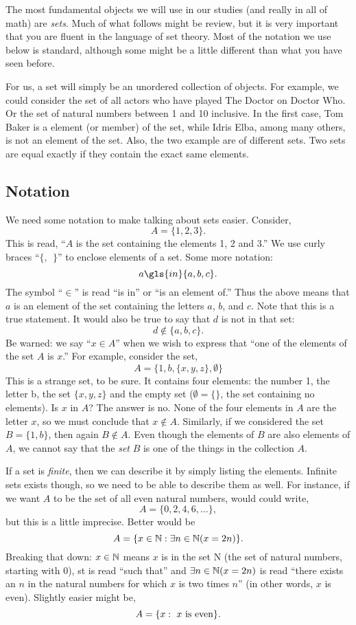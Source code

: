 \documentclass[12pt]{article}
\begin{document}
The most fundamental objects we will use in our studies (and really in all of math) are \textit{sets}.  Much of what follows might be review, but it is very important that you are fluent in the language of set theory.  Most of the notation we use below is standard, although some might be a little different than what you have seen before.

For us, a set will simply be an unordered collection of objects.  For example, we could consider the set of all actors who have played The Doctor on Doctor Who.  Or the set of natural numbers between 1 and 10 inclusive.  In the first case, Tom Baker is a element (or member) of the set, while Idris Elba, among many others, is not an element of the set.  Also, the two example are of different sets.  Two sets are equal exactly if they contain the exact same elements.



\subsection{Notation}

We need some notation to make talking about sets easier.  Consider,
\[ A = \{1, 2, 3\}.\]
This is read, ``$A$ is the set containing the elements 1, 2 and 3.''  We use curly braces ``$\{,~~ \}$'' to enclose elements of a set.  Some more notation:
\[ a \gls{in} \{a, b, c\}. \]
The symbol ``$\in$'' is read ``is in'' or ``is an element of.''  Thus the above means that $a$ is an element of the set containing the letters $a$, $b$, and $c$.  Note that this is a true statement.  It would also be true to say that $d$ is not in that set:
\[ d \not\in \{a, b, c\}.\]
Be warned: we say ``$x \in A$'' when we wish to express that ``one of the elements of the set $A$ is $x$.''  For example, consider the set,
\[A = \{1, b, \{x, y, z\}, \emptyset\}\]
This is a strange set, to be sure. It contains four elements: the number 1, the letter b, the set $\{x,y,z\}$ and the empty set ($\emptyset = \{ \}$, the set containing no elements).  Is $x$ in $A$?  The answer is no.  None of the four elements in $A$ are the letter $x$, so we must conclude that $x \notin A$.  Similarly, if we considered the set $B = \{1,b\}$, then again $B \notin A$.  Even though the elements of $B$ are also elements of $A$, we cannot say that the \emph{set} $B$ is one of the things in the collection $A$. 

If a set is \emph{finite}, then we can describe it by simply listing the elements.  Infinite sets exists though, so we need to be able to describe them as well.  For instance, if we want $A$ to be the set of all even natural numbers, would could write,
\[ A = \{0, 2, 4, 6, \ldots\},\]
but this is a little imprecise.  Better would be
\[ A = \{x \in \mathbb N : \exists n\in \mathbb N ( x = 2 n)\}.\]
Breaking that down: $x \in \mathbb N$ means $x$ is in the set \gls{N} (the set of natural numbers, starting with 0), \gls{st} is read ``such that'' and $\exists n\in \mathbb N (x = 2n)$ is read ``there exists an $n$ in the natural numbers for which $x$ is two times $n$'' (in other words, $x$ is even).  Slightly easier might be,
\[ A = \{x : \mbox{ $x$ is even}\}. \]
\end{document}
